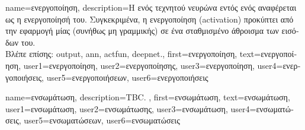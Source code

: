 {name={\foreignlanguage{greek}{ενεργοποίηση}},
	description={\foreignlanguage{greek}{Η}  \foreignlanguage{greek}{ενός τεχνητού 
		νευρώνα} \foreignlanguage{greek}{εντός ενός}  
		\foreignlanguage{greek}{αναφέρεται ως η ενεργοποίησή του. Συγκεκριμένα, η ενεργοποίηση} (activation) 
		\foreignlanguage{greek}{προκύπτει από την εφαρμογή μίας (συνήθως μη γραμμικής)} 
	 	 \foreignlanguage{greek}{σε ένα σταθμισμένο άθροισμα των εισόδων του.} 
		\\
		\foreignlanguage{greek}{Βλέπε επίσης:} \gls{output}, \gls{ann}, \gls{actfun}, \gls{deepnet}.}, 
	first={\foreignlanguage{greek}{ενεργοποίηση}},
	text={\foreignlanguage{greek}{ενεργοποίηση}},
	user1={\foreignlanguage{greek}{ενεργοποίηση}}, %
	user2={\foreignlanguage{greek}{ενεργοποίησης}}, %
	user3={\foreignlanguage{greek}{ενεργοποίηση}}, %
	user4={\foreignlanguage{greek}{ενεργοποιήσεις}}, %
	user5={\foreignlanguage{greek}{ενεργοποιήσεων}}, %
	user6={\foreignlanguage{greek}{ενεργοποιήσεις}} %
}

{name={\foreignlanguage{greek}{ενσωμάτωση}},
	description={TBC. },
	first={\foreignlanguage{greek}{ενσωμάτωση}},
	text={\foreignlanguage{greek}{ενσωμάτωση}},
	user1={\foreignlanguage{greek}{ενσωμάτωση}}, %
	user2={\foreignlanguage{greek}{ενσωμάτωσης}}, %
	user3={\foreignlanguage{greek}{ενσωμάτωση}}, %
	user4={\foreignlanguage{greek}{ενσωματώσεις}}, %
	user5={\foreignlanguage{greek}{ενσωματώσεων}}, %
	user6={\foreignlanguage{greek}{ενσωματώσεις}} %
}%

